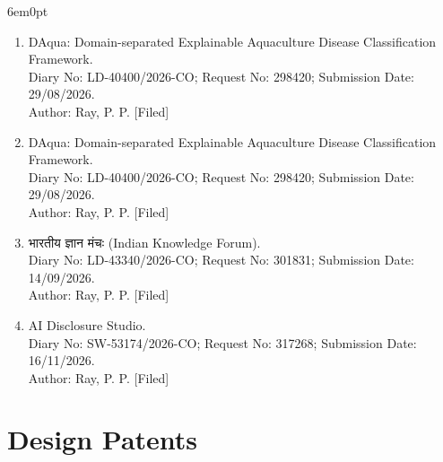 \documentclass[11pt,a4paper]{moderncv}
\begin{document}
\begin{adjustwidth}{6em}{0pt}
\begin{enumerate}
		\item DAqua: Domain-separated Explainable Aquaculture Disease Classification Framework. \\
		Diary No: LD-40400/2026-CO; Request No: 298420; Submission Date: 29/08/2026. \\
		Author: Ray, P. P. [Filed]
		
		\item DAqua: Domain-separated Explainable Aquaculture Disease Classification Framework. \\
		Diary No: LD-40400/2026-CO; Request No: 298420; Submission Date: 29/08/2026. \\
		Author: Ray, P. P. [Filed]
		
		\item भारतीय ज्ञान मंचः (Indian Knowledge Forum). \\
		Diary No: LD-43340/2026-CO; Request No: 301831; Submission Date: 14/09/2026. \\
		Author: Ray, P. P. [Filed]


		\item AI Disclosure Studio. \\
		Diary No: SW-53174/2026-CO; Request No: 317268; Submission Date: 16/11/2026. \\
		Author: Ray, P. P. [Filed]
		
	\end{enumerate}
\end{adjustwidth}




\section{\textbf{Design Patents}}
\end{document}

